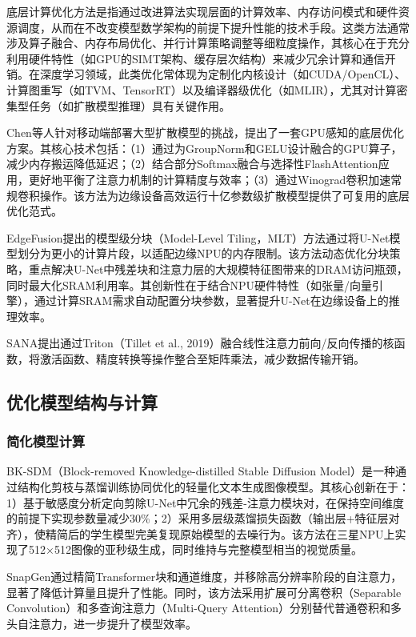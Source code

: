 \documentclass[11pt,a4paper,UTF8]{ctexart}
\begin{document}
底层计算优化方法是指通过改进算法实现层面的计算效率、内存访问模式和硬件资源调度，从而在不改变模型数学架构的前提下提升性能的技术手段。这类方法通常涉及算子融合、内存布局优化、并行计算策略调整等细粒度操作，其核心在于充分利用硬件特性（如GPU的SIMT架构、缓存层次结构）来减少冗余计算和通信开销。在深度学习领域，此类优化常体现为定制化内核设计（如CUDA/OpenCL）、计算图重写（如TVM\cite{TVM}、TensorRT）以及编译器级优化（如MLIR\cite{mlir}），尤其对计算密集型任务（如扩散模型推理）具有关键作用。

Chen等人\cite{chen2023speed}针对移动端部署大型扩散模型的挑战，提出了一套GPU感知的底层优化方案。其核心技术包括：（1）通过为GroupNorm和GELU设计融合的GPU算子，减少内存搬运降低延迟；（2）结合部分Softmax融合与选择性FlashAttention\cite{dao2022flashattention}应用，更好地平衡了注意力机制的计算精度与效率；（3）通过Winograd卷积加速常规卷积操作。该方法为边缘设备高效运行十亿参数级扩散模型提供了可复用的底层优化范式。

EdgeFusion提出的模型级分块（Model-Level Tiling，MLT）方法通过将U-Net模型划分为更小的计算片段，以适配边缘NPU的内存限制。该方法动态优化分块策略，重点解决U-Net中残差块和注意力层的大规模特征图带来的DRAM访问瓶颈，同时最大化SRAM利用率。其创新性在于结合NPU硬件特性（如张量/向量引擎），通过计算SRAM需求自动配置分块参数，显著提升U-Net在边缘设备上的推理效率。

SANA提出通过Triton（Tillet et al., 2019）融合线性注意力前向/反向传播的核函数，将激活函数、精度转换等操作整合至矩阵乘法，减少数据传输开销。


\newpage

\subsection{优化模型结构与计算}

\subsubsection{简化模型计算}

BK-SDM（Block-removed Knowledge-distilled Stable Diffusion Model）是一种通过结构化剪枝与蒸馏训练协同优化的轻量化文本生成图像模型。其核心创新在于：1）基于敏感度分析定向剪除U-Net中冗余的残差-注意力模块对，在保持空间维度的前提下实现参数量减少30\%；2）采用多层级蒸馏损失函数（输出层+特征层对齐），使精简后的学生模型完美复现原始模型的去噪行为。该方法在三星NPU上实现了512×512图像的亚秒级生成，同时维持与完整模型相当的视觉质量。

SnapGen\cite{hu2024snapgen}通过精简Transformer块和通道维度，并移除高分辨率阶段的自注意力，显著了降低计算量且提升了性能。同时，该方法采用扩展可分离卷积（Separable Convolution）\cite{howard2017mobilenets}和多查询注意力（Multi-Query Attention）\cite{shazeer2019fast}分别替代普通卷积和多头自注意力，进一步提升了模型效率。
\end{document}
